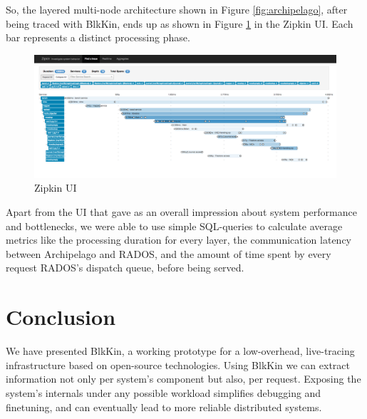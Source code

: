 \documentclass[11pt,journal,compsoc]{IEEEtran}
\begin{document}
\begin{center}
\end{center}

So, the layered multi-node architecture shown in Figure \ref{fig:archipelago},
after being traced with BlkKin, ends up as shown in Figure \ref{fig:zipkin} in
the Zipkin UI. Each bar represents a distinct processing phase.

\begin{center}
\begin{figure}[h!]
  \centering
  \includegraphics[scale=0.13]{figs/zipkin.png}
  \caption{Zipkin UI}
  \label{fig:zipkin}
\end{figure}
\end{center}
Apart from the UI that gave as an overall impression about system
performance and bottlenecks, we were able to use simple SQL-queries to
calculate average metrics like the processing duration for every layer, the
communication latency between Archipelago and RADOS, and the amount of time
spent by every request RADOS's dispatch queue, before being served.

\section{Conclusion}

We have presented BlkKin, a working prototype for a low-overhead, live-tracing
infrastructure based on open-source technologies. Using BlkKin we can extract
information not only per system's component but also, per request. Exposing the
system's internals under any possible workload simplifies debugging and
finetuning, and can eventually lead to more reliable distributed systems.



\end{document}

